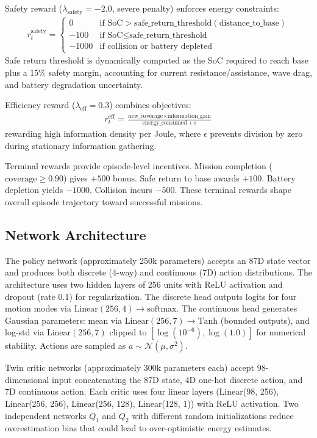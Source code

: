 Safety reward ($\lambda_{\text{safety}} = -2.0$, severe penalty) enforces energy constraints:
\begin{align}
r^{\text{safety}}_t = \begin{cases}
0 & \text{if } \text{SoC} > \text{safe\_return\_threshold}(\text{distance\_to\_base}) \\
-100 & \text{if } \text{SoC} \leq \text{safe\_return\_threshold} \\
-1000 & \text{if collision or battery depleted}
\end{cases}
\end{align}
Safe return threshold is dynamically computed as the SoC required to reach base plus a 15\% safety margin, accounting for current resistance/assistance, wave drag, and battery degradation uncertainty.

Efficiency reward ($\lambda_{\text{eff}} = 0.3$) combines objectives:
\begin{align}
r^{\text{eff}}_t = \frac{\text{new\_coverage} \times \text{information\_gain}}{\text{energy\_consumed} + \epsilon}
\end{align}
rewarding high information density per Joule, where $\epsilon$ prevents division by zero during stationary information gathering.

Terminal rewards provide episode-level incentives. Mission completion ($\text{coverage} \geq 0.90$) gives $+500$ bonus. Safe return to base awards $+100$. Battery depletion yields $-1000$. Collision incurs $-500$. These terminal rewards shape overall episode trajectory toward successful missions.

\subsection{Network Architecture}

The policy network (approximately 250k parameters) accepts an 87D state vector and produces both discrete (4-way) and continuous (7D) action distributions. The architecture uses two hidden layers of 256 units with ReLU activation and dropout (rate 0.1) for regularization. The discrete head outputs logits for four motion modes via $\text{Linear}(256, 4) \to \text{softmax}$. The continuous head generates Gaussian parameters: mean via $\text{Linear}(256, 7) \to \text{Tanh}$ (bounded outputs), and log-std via $\text{Linear}(256, 7)$ clipped to $[\log(10^{-6}), \log(1.0)]$ for numerical stability. Actions are sampled as $a \sim \mathcal{N}(\mu, \sigma^2)$.

Twin critic networks (approximately 300k parameters each) accept 98-dimensional input concatenating the 87D state, 4D one-hot discrete action, and 7D continuous action. Each critic uses four linear layers (Linear(98, 256), Linear(256, 256), Linear(256, 128), Linear(128, 1)) with ReLU activation. Two independent networks $Q_1$ and $Q_2$ with different random initializations reduce overestimation bias that could lead to over-optimistic energy estimates.

